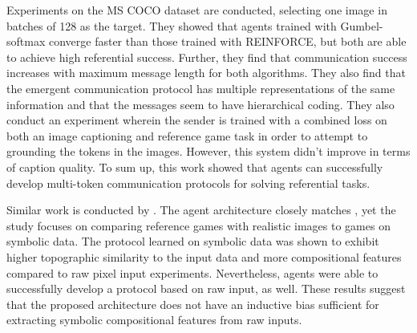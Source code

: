 Experiments on the MS COCO dataset are conducted, selecting one image in batches of 128 as the target. They showed that agents trained with Gumbel-softmax converge faster than those trained with REINFORCE, but both are able to achieve high referential success. Further, they find that communication success increases with maximum message length for both algorithms. They also find that the emergent communication protocol has multiple representations of the same information and that the messages seem to have hierarchical coding. They also conduct an experiment wherein the sender is trained with a combined loss on both an image captioning and reference game task in order to attempt to grounding the tokens in the images. However, this system didn't improve in terms of caption quality. To sum up, this work showed that agents can successfully develop multi-token communication protocols for solving referential tasks.

Similar work is conducted by \cite{lazaridou2018emergence}. The agent architecture closely matches \cite{havrylov2017emergence}, yet the study focuses on comparing reference games with realistic images to games on symbolic data. The protocol learned on symbolic data was shown to exhibit higher topographic similarity to the input data and more compositional features compared to raw pixel input experiments. Nevertheless, agents were able to successfully develop a protocol based on raw input, as well. These results suggest that the proposed architecture does not have an inductive bias sufficient for extracting symbolic compositional features from raw inputs. 

